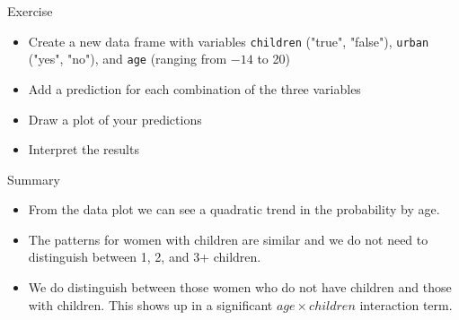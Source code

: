 \documentclass[aspectratio=169]{beamer}
\begin{document}
\begin{frame}{}
  \begin{block}{Exercise}
    \begin{itemize}
      \item Create a new data frame with variables \texttt{children} ("true",
        "false"), \texttt{urban} ("yes", "no"), and \texttt{age} (ranging from
        $-14$ to 20)
      \item Add a prediction for each combination of the three variables
      \item Draw a plot of your predictions
      \item Interpret the results
    \end{itemize}
  \end{block}
\end{frame}

\begin{frame}{Summary}
  \begin{itemize}
    \item From the data plot we can see a quadratic trend in the probability by
      age.
    \item The patterns for women with children are similar and we do not need to
      distinguish between 1, 2, and 3+ children.
    \item We do distinguish between those women who do not have children and
      those with children. This shows up in a significant $age \times children$
      interaction term.
  \end{itemize}
\end{frame}

\end{document}
